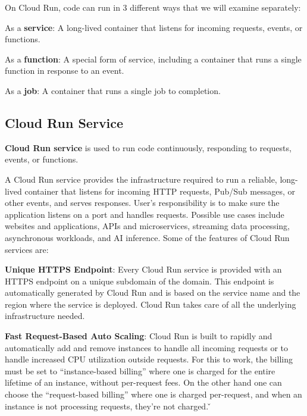 On Cloud Run, code can run in 3 different ways that we will examine separately:
\bit
\item As a \textbf{service}: A long-lived container that listens for incoming requests, events, or functions.
\item As a \textbf{function}: A special form of service, including a container that runs a single function in response
to an event.
\item As a \textbf{job}: A container that runs a single job to completion.
\eit

\subsection{Cloud Run Service}

\textbf{Cloud Run service} is used to run code continuously, responding to requests, events, or functions.
\ed


A Cloud Run service provides the infrastructure required to run a reliable, long-lived container that listens for
incoming HTTP requests, Pub/Sub messages, or other events, and serves responses. User's responsibility is to make
sure the application listens on a port and handles requests. Possible use cases include websites and applications,
APIs and microservices, streaming data processing, asynchronous workloads, and AI inference. Some of the features of
Cloud Run services are:

\bit
\item \textbf{Unique HTTPS Endpoint}: Every Cloud Run service is provided with an HTTPS endpoint on a unique
subdomain of the  domain. This endpoint is automatically generated by Cloud Run and is based on the
service name and the region where the service is deployed. Cloud Run takes care of all the underlying infrastructure
needed.

\item \textbf{Fast Request-Based Auto Scaling}: Cloud Run is built to rapidly and automatically add and remove
instances to handle all incoming requests or to handle increased CPU utilization outside requests. For this to work,
the billing must be set to ``instance-based billing'' where one is charged for the entire lifetime of an instance,
without per-request fees. On the other hand one can choose the ``request-based billing'' where one is charged
per-request, and when an instance is not processing requests, they're not charged. \v

